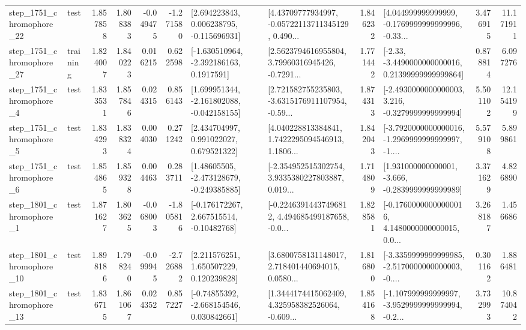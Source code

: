 \begin{tabular}{llrrrrllrlrr}
 step\_1751\_chromophore\_22 &      test &      1.857858 &    1.808383 &     -0.049475 & -1.271580 &    [2.694223843, 0.006238795, -0.115696931] &  [4.43709777934997, -0.05722113711345129, 0.490... &       1.846232 &  [4.044999999999999, -0.1769999999999996, -0.33... &            3.476915 &         11.171911 \\
 step\_1751\_chromophore\_27 &  training &      1.824007 &    1.840223 &      0.016215 &  0.622598 &     [-1.630510964, -2.392186163, 0.1917591] &  [2.5623794616955804, 3.79960316945426, -0.7291... &       1.771442 &  [-2.33, -3.4490000000000016, 0.21399999999999864] &            0.878814 &          6.097276 \\
  step\_1751\_chromophore\_4 &      test &      1.833531 &    1.857846 &      0.024315 &  0.856143 &   [1.699951344, -2.161802088, -0.042158155] &  [2.721582755235803, -3.6315176911107954, -0.59... &       1.874313 &  [-2.4930000000000003, 3.216, -0.3279999999999994] &            5.501102 &         12.154199 \\
  step\_1751\_chromophore\_5 &      test &      1.834293 &    1.838324 &      0.004030 &  0.271242 &     [2.434704997, 0.991022027, 0.679521322] &  [4.040228813384841, 1.7422295094546913, 1.1806... &       1.842043 &  [-3.7920000000000016, -1.2969999999999997, -1.... &            5.579108 &          5.899861 \\
  step\_1751\_chromophore\_6 &      test &      1.854865 &    1.859328 &      0.004463 &  0.283711 &    [1.48605505, -2.473128679, -0.249385885] &  [-2.354952515302754, 3.9335380227803887, 0.019... &       1.714809 &   [1.931000000000001, -3.666, -0.2839999999999989] &            3.371629 &          4.826890 \\
  step\_1801\_chromophore\_1 &      test &      1.871627 &    1.803625 &     -0.068003 & -1.805816 &    [-0.176172267, 2.667515514, -0.10482768] &  [-0.22463914437496812, 4.494685499187658, -0.0... &       1.828581 &  [-0.17600000000000016, 4.1480000000000015, 0.0... &            3.268187 &          1.456686 \\
 step\_1801\_chromophore\_10 &      test &      1.898186 &    1.798240 &     -0.099945 & -2.726882 &     [2.211576251, 1.650507229, 0.120239828] &  [3.6800758131148017, 2.718401440694015, 0.0580... &       1.816800 &  [-3.3359999999999985, -2.5170000000000003, -0.... &            0.301162 &          1.886481 \\
 step\_1801\_chromophore\_13 &      test &      1.836715 &    1.861067 &      0.024352 &  0.857227 &    [-0.74855392, -2.668154546, 0.030842661] &  [1.3444174415062409, 4.325958382526064, -0.609... &       1.854168 &  [-1.107999999999997, -3.9529999999999994, -0.2... &            3.732993 &         10.874042 \\

\end{tabular}
